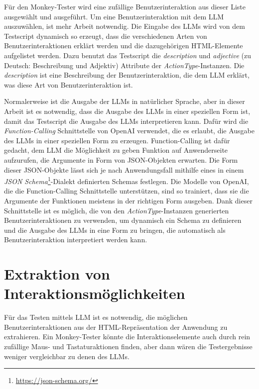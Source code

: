 Für den Monkey-Tester wird eine zufällige Benutzerinteraktion aus dieser Liste ausgewählt und ausgeführt.
Um eine Benutzerinteraktion mit dem LLM auszuwählen, ist mehr Arbeit notwendig.
Die Eingabe des LLMs wird von dem Testscript dynamisch so erzeugt, dass die verschiedenen Arten von Benutzerinteraktionen erklärt werden und die dazugehörigen HTML-Elemente aufgelistet werden.
Dazu benutzt das Testscript die \textit{description} und \textit{adjective} (zu Deutsch: Beschreibung und Adjektiv) Attribute der \textit{ActionType}-Instanzen.
Die \textit{description} ist eine Beschreibung der Benutzerinteraktion, die dem LLM erklärt, was diese Art von Benutzerinteraktion ist.

Normalerweise ist die Ausgabe der LLMs in natürlicher Sprache, aber in dieser Arbeit ist es notwendig, dass die Ausgabe des LLMs in einer speziellen Form ist, damit das Testscript die Ausgabe des LLMs interpretieren kann.
Dafür wird die \textit{Function-Calling} Schnittstelle von OpenAI verwendet, die es erlaubt, die Ausgabe des LLMs in einer speziellen Form zu erzeugen.
Function-Calling ist dafür gedacht, dem LLM die Möglichkeit zu geben Funktion auf Anwenderseite aufzurufen, die Argumente in Form von JSON-Objekten erwarten.
Die Form dieser JSON-Objekte lässt sich je nach Anwendungsfall mithilfe eines in einem \textit{JSON Schema}\footnote{\url{https://json-schema.org/}}-Dialekt definierten Schemas festlegen.
Die Modelle von OpenAI, die die Function-Calling Schnittstelle unterstützen, sind so trainiert, dass sie die Argumente der Funktionen meistens in der richtigen Form ausgeben.
Dank dieser Schnittstelle ist es möglich, die von den \textit{ActionType}-Instanzen generierten Benutzerinteraktionen zu verwenden, um dynamisch ein Schema zu definieren und die Ausgabe des LLMs in eine Form zu bringen, die automatisch als Benutzerinteraktion interpretiert werden kann.



\section{Extraktion von Interaktionsmöglichkeiten}

Für das Testen mittels LLM ist es notwendig, die möglichen Benutzerinteraktionen aus der HTML-Repräsentation der Anwendung zu extrahieren.
Ein Monkey-Tester könnte die Interaktionselemente auch durch rein zufällige Maus- und Tastaturaktionen finden, aber dann wären die Testergebnisse weniger vergleichbar zu denen des LLMs.

